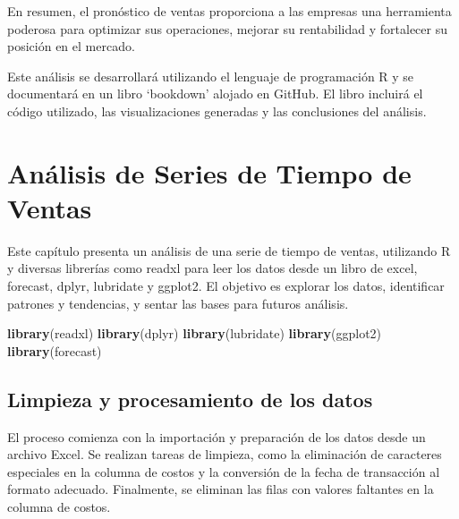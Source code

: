 \documentclass[
]{book}
\newenvironment{Shaded}{\begin{snugshade}}{\end{snugshade}}
\newcommand{\AttributeTok}[1]{\textcolor[rgb]{0.13,0.29,0.53}{#1}}
\newcommand{\CommentTok}[1]{\textcolor[rgb]{0.56,0.35,0.01}{\textit{#1}}}
\newcommand{\ConstantTok}[1]{\textcolor[rgb]{0.56,0.35,0.01}{#1}}
\newcommand{\FunctionTok}[1]{\textcolor[rgb]{0.13,0.29,0.53}{\textbf{#1}}}
\newcommand{\NormalTok}[1]{#1}
\newcommand{\SpecialCharTok}[1]{\textcolor[rgb]{0.81,0.36,0.00}{\textbf{#1}}}
\begin{document}
En resumen, el pronóstico de ventas proporciona a las empresas una herramienta poderosa para optimizar sus operaciones, mejorar su rentabilidad y fortalecer su posición en el mercado.

Este análisis se desarrollará utilizando el lenguaje de programación R y se documentará en un libro `bookdown' alojado en GitHub. El libro incluirá el código utilizado, las visualizaciones generadas y las conclusiones del análisis.

\chapter{Análisis de Series de Tiempo de Ventas}\label{anuxe1lisis-de-series-de-tiempo-de-ventas}

Este capítulo presenta un análisis de una serie de tiempo de ventas, utilizando R y diversas librerías como readxl para leer los datos desde un libro de excel, forecast, dplyr, lubridate y ggplot2. El objetivo es explorar los datos, identificar patrones y tendencias, y sentar las bases para futuros análisis.

\begin{Shaded}
\end{Shaded}

\begin{Shaded}
\begin{Highlighting}[]
\FunctionTok{library}\NormalTok{(readxl)}
\FunctionTok{library}\NormalTok{(dplyr)}
\FunctionTok{library}\NormalTok{(lubridate)}
\FunctionTok{library}\NormalTok{(ggplot2)}
\FunctionTok{library}\NormalTok{(forecast)}
\end{Highlighting}
\end{Shaded}

\section{Limpieza y procesamiento de los datos}\label{limpieza-y-procesamiento-de-los-datos}

El proceso comienza con la importación y preparación de los datos desde un archivo Excel. Se realizan tareas de limpieza, como la eliminación de caracteres especiales en la columna de costos y la conversión de la fecha de transacción al formato adecuado. Finalmente, se eliminan las filas con valores faltantes en la columna de costos.
\end{document}
